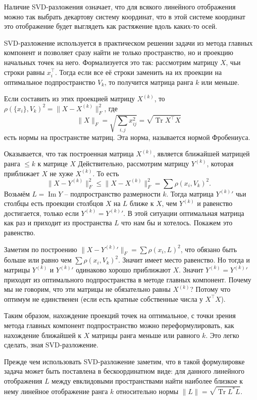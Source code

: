 \documentclass[10pt,a4paper,oneside]{book}
\theoremstyle{definition}
\renewcommand{\leq}{\leqslant}
\renewcommand{\Im}{\operatorname{Im}}
\newcommand{\Tr}{\operatorname{Tr}}
\begin{document}
Наличие SVD-разложения означает, что для всякого линейного отображения можно так выбрать декартову систему координат, что в этой системе координат это отображение будет выглядеть как растяжение вдоль каких-то осей.





SVD-разложение используется в практическом решении задачи из метода главных компонент и позволяет сразу найти не только пространство, но и проекцию начальных точек на него. Формализуется это так: рассмотрим матрицу $X$, чьи строки равны $x_i^{\top}$. Тогда если все её строки заменить на их проекции на оптимальное подпространство $V_k$, то получится матрица ранга $k$ или меньше.

Если составить из этих проекцией матрицу $X^{(k)}$, то $\rho(\{x_i\}, V_k)^2= \|X-X^{(k)}\|_F^2 $, где 
$$\|X\|_F=\sqrt{\sum_{i,j} x_{ij}^2}=\sqrt{\Tr X^{\top}X}$$
есть нормы на пространстве матриц. Эта норма, называется нормой Фробениуса.

Оказывается, что так построенная матрица $X^{(k)}$, является ближайшей матрицей ранга $\leq k$ к матрице $X$
Действительно, рассмотрим матрицу $Y^{(k)}$, которая приближает $X$ не хуже $X^{(k)}$. То есть 
$$\|X -Y^{(k)}\|_F^2 \leq \| X-X^{(k)}\|_F^2= \sum \rho(x_i, V_k)^2.$$
Возьмём $L=\Im Y$ -- подпространство размерности $k$. Тогда матрица ${Y^{(k)}}'$ чьи столбцы есть проекции столбцов $X$ на $L$ ближе к $X$, чем $Y^{(k)}$ и равенство достигается, только если $Y^{(k)}={Y^{(k)}}'$. В этой ситуации оптимальная матрица как раз и приходит из пространства $L$ что нам бы и хотелось. Покажем это равенство.

Заметим по построению $\| X - {Y^{(k)}}'\|_F = \sum \rho (x_i, L)^2$, что обязано быть больше или равно чем $\sum \rho(x_i, V_k)^2$. Значит имеет место равенство. Но тогда и матрицы $Y^{(k)}$ и ${Y^{(k)}}'$ одинаково хорошо приближают $X$. Значит $Y^{(k)}={Y^{(k)}}'$ приходят из оптимального подпространства в методе главных компонент. Почему мы не говорим, что эти матрицы не обязательно равны $X^{(k)}$? Потому что оптимум не единственен (если есть кратные собственные числа у $X^\top X$).


Таким образом, нахождение проекций точек на оптимальное, с точки зрения метода главных компонент подпространство можно переформулировать, как нахождение ближайшей к $X$ матрицы ранга меньше или равного $k$. Это легко сделать, зная SVD-разложение.

Прежде чем использовать SVD-разложение заметим, что в такой формулировке задача может быть поставлена в бескоординатном виде: для данного линейного отображения $L$ между евклидовыми пространствами найти наиболее близкое к нему линейное отображение ранга $k$ относительно нормы $\|L\|=\sqrt{\Tr L^*L}$.
\end{document}
